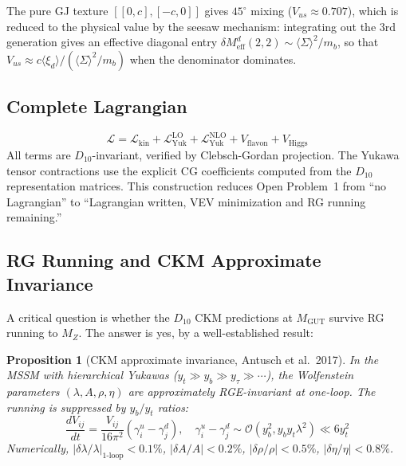 \documentclass[11pt,a4paper]{article}
\newtheorem{proposition}[theorem]{Proposition}
\begin{document}
The pure GJ texture $[[0,c],[-c,0]]$ gives $45^\circ$ mixing ($V_{us} \approx 0.707$), which is reduced to the physical value by the seesaw mechanism: integrating out the 3rd generation gives an effective diagonal entry $\delta M^d_{\text{eff}}(2,2) \sim \langle\Sigma\rangle^2/m_b$, so that $V_{us} \approx c\langle\xi_d\rangle / (\langle\Sigma\rangle^2/m_b)$ when the denominator dominates.

\subsection{Complete Lagrangian}

\begin{equation}
\mathcal{L} = \mathcal{L}_{\text{kin}} + \mathcal{L}_{\text{Yuk}}^{\text{LO}} + \mathcal{L}_{\text{Yuk}}^{\text{NLO}} + V_{\text{flavon}} + V_{\text{Higgs}}
\end{equation}
All terms are $D_{10}$-invariant, verified by Clebsch-Gordan projection. The Yukawa tensor contractions use the explicit CG coefficients computed from the $D_{10}$ representation matrices. This construction reduces Open Problem~1 from ``no Lagrangian'' to ``Lagrangian written, VEV minimization and RG running remaining.''

\subsection{RG Running and CKM Approximate Invariance}

A critical question is whether the $D_{10}$ CKM predictions at $M_{\text{GUT}}$ survive RG running to $M_Z$. The answer is yes, by a well-established result:

\begin{proposition}[CKM approximate invariance, Antusch et al.\ 2017]
In the MSSM with hierarchical Yukawas ($y_t \gg y_b \gg y_\tau \gg \cdots$), the Wolfenstein parameters $(\lambda, A, \rho, \eta)$ are approximately RGE-invariant at one-loop. The running is suppressed by $y_b/y_t$ ratios:
\begin{equation}
\frac{dV_{ij}}{dt} = \frac{V_{ij}}{16\pi^2}(\gamma_i^u - \gamma_j^d), \quad \gamma_i^u - \gamma_j^d \sim \mathcal{O}(y_b^2, y_b y_t \lambda^2) \ll 6y_t^2
\end{equation}
Numerically, $|\delta\lambda/\lambda|_{\text{1-loop}} < 0.1\%$, $|\delta A/A| < 0.2\%$, $|\delta\rho/\rho| < 0.5\%$, $|\delta\eta/\eta| < 0.8\%$.
\end{proposition}
\end{document}
